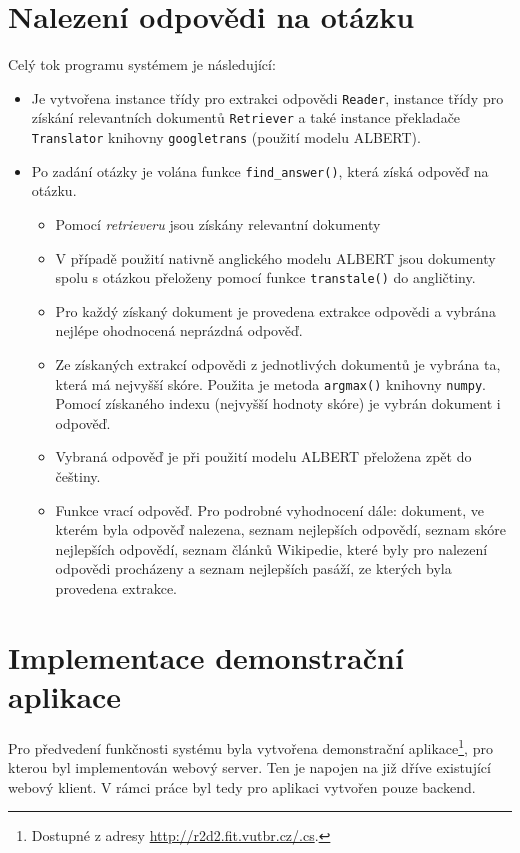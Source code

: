 \section*{Nalezení odpovědi na otázku}
Celý tok programu systémem je následující:
\begin{itemize}
    \item Je vytvořena instance třídy pro extrakci odpovědi \texttt{Reader}, instance třídy pro získání relevantních dokumentů \texttt{Retriever} a také instance překladače \texttt{Translator} knihovny \texttt{googletrans} (použití modelu ALBERT).
    
    \item Po zadání otázky je volána funkce \texttt{find\_answer()}, která získá odpověď na otázku.
    \begin{itemize}
        \item Pomocí \emph{retrieveru} jsou získány relevantní dokumenty
        \item V případě použití nativně anglického modelu ALBERT jsou dokumenty spolu s otázkou přeloženy pomocí funkce \texttt{transtale()} do angličtiny.
        \item Pro každý získaný dokument je provedena extrakce odpovědi a vybrána nejlépe ohodnocená neprázdná odpověď.
        \item Ze získaných extrakcí odpovědi z jednotlivých dokumentů je vybrána ta, která má nejvyšší skóre. Použita je metoda \texttt{argmax()} knihovny \texttt{numpy}. Pomocí získaného indexu (nejvyšší hodnoty skóre) je vybrán dokument i odpověď.
        \item Vybraná odpověď je při použití modelu ALBERT přeložena zpět do češtiny.
        \item Funkce vrací odpověď. Pro podrobné vyhodnocení dále: dokument, ve kterém byla odpověď nalezena, seznam nejlepších odpovědí, seznam skóre nejlepších odpovědí, seznam článků Wikipedie, které byly pro nalezení odpovědi procházeny a seznam nejlepších pasáží, ze kterých byla provedena extrakce.
    \end{itemize}
\end{itemize}

\section*{Implementace demonstrační aplikace}
Pro předvedení funkčnosti systému byla vytvořena demonstrační aplikace\footnote{Dostupné z adresy \url{http://r2d2.fit.vutbr.cz/.cs}.}, pro kterou byl implementován webový server. Ten je napojen na již dříve existující webový klient. V rámci práce byl tedy pro aplikaci vytvořen pouze backend.

